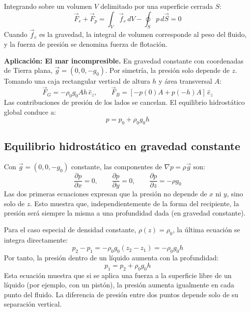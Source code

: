 Integrando sobre un volumen $V$ delimitado por una superficie cerrada $S$:
\begin{equation}
    \vec{F}_e + \vec{F}_p = \int_V \vec{f}_e\,dV - \oint_S p\,d\vec{S} = 0
\end{equation}
Cuando $\vec{f}_e$ es la gravedad, la integral de volumen corresponde al peso del fluido, y la fuerza de presión se denomina fuerza de flotación.

\textbf{Aplicación: El mar incompresible.} En gravedad constante con coordenadas de Tierra plana, $\vec{g} = (0,0,-g_0)$. Por simetría, la presión solo depende de $z$. Tomando una caja rectangular vertical de altura $h$ y área transversal $A$:
\begin{equation}
    \vec{F}_G = -\rho_0 g_0 A h\,\hat{e}_z, \qquad \vec{F}_B = [-p(0)A + p(-h)A]\,\hat{e}_z
\end{equation}
Las contribuciones de presión de los lados se cancelan. El equilibrio hidrostático global conduce a:
\begin{equation}
    p = p_0 + \rho_0 g_0 h
\end{equation}

\subsection{Equilibrio hidrostático en gravedad constante}

Con $\vec{g} = (0,0,-g_0)$ constante, las componentes de $\nabla p = \rho\vec{g}$ son:
\begin{equation}
    \frac{\partial p}{\partial x} = 0, \qquad \frac{\partial p}{\partial y} = 0, \qquad \frac{\partial p}{\partial z} = -\rho g_0
\end{equation}
Las dos primeras ecuaciones expresan que la presión no depende de $x$ ni $y$, sino solo de $z$. Esto muestra que, independientemente de la forma del recipiente, la presión será siempre la misma a una profundidad dada (en gravedad constante).

Para el caso especial de densidad constante, $\rho(z) = \rho_0$, la última ecuación se integra directamente:
\begin{equation}
    p_2 - p_1 = -\rho_0 g_0(z_2 - z_1) = -\rho_0 g_0 h
\end{equation}
Por tanto, la presión dentro de un líquido aumenta con la profundidad:
\begin{equation}
    \boxed{p_1 = p_2 + \rho_0 g_0 h}
\end{equation}
Esta ecuación muestra que si se aplica una fuerza a la superficie libre de un líquido (por ejemplo, con un pistón), la presión aumenta igualmente en cada punto del fluido. La diferencia de presión entre dos puntos depende solo de su separación vertical.

